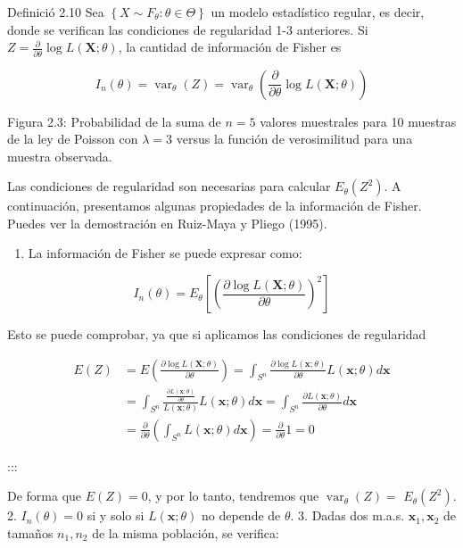 \documentclass[
]{article}
\providecommand{\tightlist}{%
  \setlength{\itemsep}{0pt}\setlength{\parskip}{0pt}}
\begin{document}
Definició 2.10 Sea \(\left\{X \sim F_{\theta}: \theta \in \Theta\right\}\) un modelo estadístico regular, es decir, donde se verifican las condiciones de regularidad 1-3 anteriores. Si \(Z=\frac{\partial}{\partial \theta} \log L(\mathbf{X} ; \theta)\), la cantidad de información de Fisher es

\[
I_{n}(\theta)=\operatorname{var}_{\theta}(Z)=\operatorname{var}_{\theta}\left(\frac{\partial}{\partial \theta} \log L(\mathbf{X} ; \theta)\right)
\]

Figura 2.3: Probabilidad de la suma de \(n=5\) valores muestrales para 10 muestras de la ley de Poisson con \(\lambda=3\) versus la función de verosimilitud para una muestra observada.

Las condiciones de regularidad son necesarias para calcular \(E_{\theta}\left(Z^{2}\right)\).
A continuación, presentamos algunas propiedades de la información de Fisher. Puedes ver la demostración en Ruiz-Maya y Pliego (1995).

\begin{enumerate}
\def\labelenumi{\arabic{enumi}.}
\tightlist
\item
  La información de Fisher se puede expresar como:
\end{enumerate}

\[
I_{n}(\theta)=E_{\theta}\left[\left(\frac{\partial \log L(\mathbf{X} ; \theta)}{\partial \theta}\right)^{2}\right]
\]

Esto se puede comprobar, ya que si aplicamos las condiciones de regularidad

\[
\begin{aligned}
E(Z) & =E\left(\frac{\partial \log L(\mathbf{X} ; \theta)}{\partial \theta}\right)=\int_{S^{n}} \frac{\partial \log L(\mathbf{x} ; \theta)}{\partial \theta} L(\mathbf{x} ; \theta) d \mathbf{x} \\
& =\int_{S^{n}} \frac{\frac{\partial L(\mathbf{x} ; \theta)}{\partial \theta}}{L(\mathbf{x} ; \theta)} L(\mathbf{x} ; \theta) d \mathbf{x}=\int_{S^{n}} \frac{\partial L(\mathbf{x} ; \theta)}{\partial \theta} d \mathbf{x} \\
& =\frac{\partial}{\partial \theta}\left(\int_{S^{n}} L(\mathbf{x} ; \theta) d \mathbf{x}\right)=\frac{\partial}{\partial \theta} 1=0
\end{aligned}
\]

:::

De forma que \(E(Z)=0\), y por lo tanto, tendremos que \(\operatorname{var}_{\theta}(Z)=\) \(E_{\theta}\left(Z^{2}\right)\).
2. \(I_{n}(\theta)=0\) si y solo si \(L(\mathbf{x} ; \theta)\) no depende de \(\theta\).
3. Dadas dos m.a.s. \(\mathbf{x}_{1}, \mathbf{x}_{2}\) de tamaños \(n_{1}, n_{2}\) de la misma población, se verifica:
\end{document}
